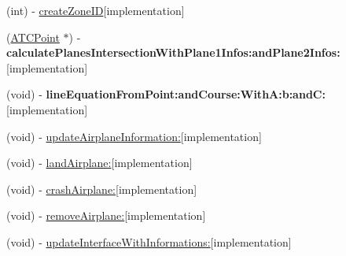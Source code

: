 \begin{DoxyCompactItemize}
\item 
(int) -\/ \hyperlink{interface_environment_adca1b072cc72d7e1e3cf51f265d0780b}{create\-Zone\-I\-D}{\ttfamily  \mbox{[}implementation\mbox{]}}
\item 
\hypertarget{interface_environment_a84e94279398d88a72243364e8cf98afd}{
(\hyperlink{interface_a_t_c_point}{\-A\-T\-C\-Point} $\ast$) -\/ {\bfseries calculate\-Planes\-Intersection\-With\-Plane1\-Infos\-:and\-Plane2\-Infos\-:}{\ttfamily  \mbox{[}implementation\mbox{]}}}
\label{interface_environment_a84e94279398d88a72243364e8cf98afd}

\item 
\hypertarget{interface_environment_a9e39d539d6e429814e2f92932d77b5d4}{
(void) -\/ {\bfseries line\-Equation\-From\-Point\-:and\-Course\-:\-With\-A\-:b\-:and\-C\-:}{\ttfamily  \mbox{[}implementation\mbox{]}}}
\label{interface_environment_a9e39d539d6e429814e2f92932d77b5d4}

\item 
(void) -\/ \hyperlink{interface_environment_a0fb5f82206bc9d8404d8dae4fe53e7d1}{update\-Airplane\-Information\-:}{\ttfamily  \mbox{[}implementation\mbox{]}}
\item 
(void) -\/ \hyperlink{interface_environment_aadba00d3e1ef7a5c94073cae64efa406}{land\-Airplane\-:}{\ttfamily  \mbox{[}implementation\mbox{]}}
\item 
(void) -\/ \hyperlink{interface_environment_a7b809370007c121fd16faaa1cdd7354b}{crash\-Airplane\-:}{\ttfamily  \mbox{[}implementation\mbox{]}}
\item 
(void) -\/ \hyperlink{interface_environment_a0d3dc964e5b6e6c9b4d73e99796c2d30}{remove\-Airplane\-:}{\ttfamily  \mbox{[}implementation\mbox{]}}
\item 
(void) -\/ \hyperlink{interface_environment_a69d6de38803175da4f50bb45e89ac29f}{update\-Interface\-With\-Informations\-:}{\ttfamily  \mbox{[}implementation\mbox{]}}
\end{DoxyCompactItemize}
